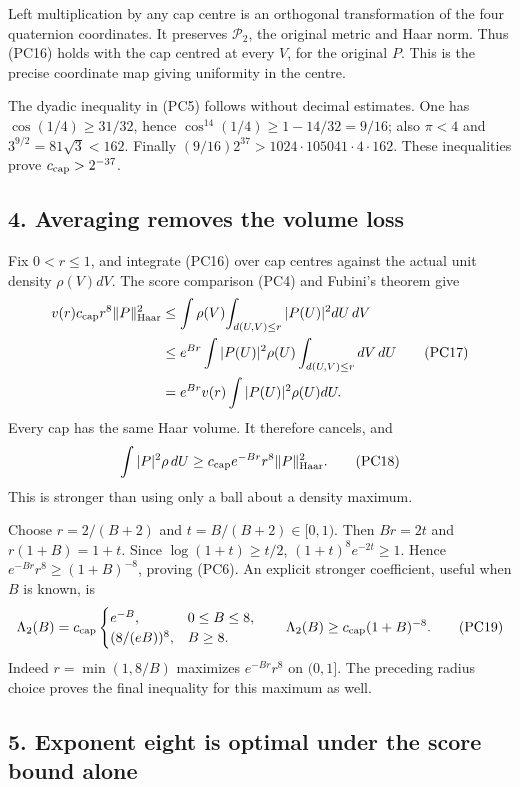 \documentclass[11pt]{article}
\begin{document}
Left multiplication by any cap centre is an orthogonal transformation
of the four quaternion coordinates. It preserves \(\mathcal P_2\),
the original metric and Haar norm. Thus (PC16) holds with the cap
centred at every \(V\), for the original \(P\). This is the precise
coordinate map giving uniformity in the centre.

The dyadic inequality in (PC5) follows without decimal estimates.
One has
\(\cos(1/4)\ge31/32\), hence
\(\cos^{14}(1/4)\ge1-14/32=9/16\);
also \(\pi<4\) and \(3^{9/2}=81\sqrt3<162\).
Finally
\((9/16)2^{37}>1024\cdot105041\cdot4\cdot162\).
These inequalities prove \(c_{\rm cap}>2^{-37}\).

\subsection*{4. Averaging removes the volume loss}

Fix \(0<r\le1\), and integrate (PC16) over cap centres against the
actual unit density \(\rho(V)dV\). The score comparison (PC4) and
Fubini's theorem give
\[
 \begin{aligned}
 v(r)c_{\rm cap}r^8\|P\|_{\rm Haar}^2
 &\le \int\rho(V)\!
             \int_{d(U,V)\le r}|P(U)|^2dU\,dV\\
 &\le e^{Br}\int |P(U)|^2\rho(U)
                  \int_{d(U,V)\le r}dV\,dU\\
 &=e^{Br}v(r)\int|P(U)|^2\rho(U)dU .
 \end{aligned}\tag{PC17}
\]
Every cap has the same Haar volume. It therefore cancels, and
\[
 \int|P|^2\rho\,dU
 \ge c_{\rm cap}e^{-Br}r^8\|P\|_{\rm Haar}^2.
 \tag{PC18}
\]
This is stronger than using only a ball about a density maximum.

Choose \(r=2/(B+2)\) and \(t=B/(B+2)\in[0,1)\).
Then \(Br=2t\) and \(r(1+B)=1+t\).
Since \(\log(1+t)\ge t/2\),
\((1+t)^8e^{-2t}\ge1\). Hence
\(e^{-Br}r^8\ge(1+B)^{-8}\), proving (PC6).
An explicit stronger coefficient, useful when \(B\) is known, is
\[
 \Lambda_2(B)=c_{\rm cap}
 \begin{cases}
 e^{-B},&0\le B\le8,\\
 (8/(eB))^8,&B\ge8.
 \end{cases}
 \qquad
 \Lambda_2(B)\ge c_{\rm cap}(1+B)^{-8}.
 \tag{PC19}
\]
Indeed \(r=\min(1,8/B)\) maximizes \(e^{-Br}r^8\) on \((0,1]\).
The preceding radius choice proves the final inequality for this
maximum as well.

\subsection*{5. Exponent eight is optimal under the score bound alone}
\end{document}
